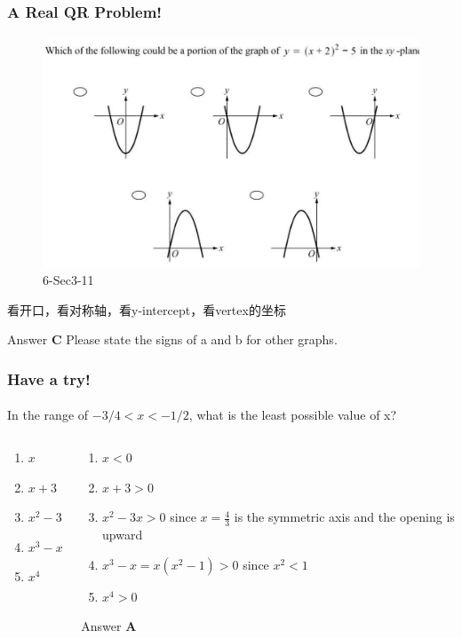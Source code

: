 \documentclass[
	11pt, %
	handout,
]{beamer}
\begin{document}
\begin{frame}
	\frametitle{A Real QR Problem!}
	\framesubtitle{}

	\begin{figure}
		\includegraphics[width=0.7\linewidth]{Parabola_Example_Question1.png}
		\caption{6-Sec3-11}
	\end{figure}

	\pause

看开口，看对称轴，看y-intercept，看vertex的坐标 \\

\pause

\bigskip
Answer \textbf{C } \pause Please state the signs of a and b for other graphs.

\end{frame}


\begin{frame}
	\frametitle{Have a try!}
	\framesubtitle{}

In the range of $-3/4 < x < -1/2$, what is the least possible value of x?
\bigskip
	\begin{columns}[t] 
		\begin{column}{0.45\textwidth} %
			\begin{enumerate}[A]
				\item $x$
				\item $x + 3$
				\item $x^2 -3x$
				\item $x^3 - x$
				\item $x^4$
			\end{enumerate}
		\end{column}
		\begin{column}{0.5\textwidth} %
		  \pause
			\begin{enumerate}[A]
				\item $x <0$ 
				\item $x + 3 >0$ 
				\item $x^2 -3x>0$ since $x=\frac{4}{3}$ is the symmetric axis and the opening is upward
				\item $x^3 - x= x(x^2 - 1) >0$ since $x^2 <1$
				\item $x^4>0$
			\end{enumerate}
		\bigskip
    Answer \textbf{A}
    \end{column}
	\end{columns}
\end{frame}
\end{document}
